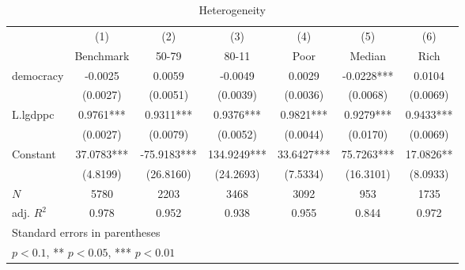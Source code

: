 \begin{table}[htbp]\centering
\def\sym#1{\ifmmode^{#1}\else\(^{#1}\)\fi}
\caption{Heterogeneity \label{tab:Heterogeneity}}
\begin{tabular}{l*{6}{c}}
\hline\hline
            &\multicolumn{1}{c}{(1)}&\multicolumn{1}{c}{(2)}&\multicolumn{1}{c}{(3)}&\multicolumn{1}{c}{(4)}&\multicolumn{1}{c}{(5)}&\multicolumn{1}{c}{(6)}\\
            &\multicolumn{1}{c}{Benchmark}&\multicolumn{1}{c}{50-79}&\multicolumn{1}{c}{80-11}&\multicolumn{1}{c}{Poor}&\multicolumn{1}{c}{Median}&\multicolumn{1}{c}{Rich}\\
\hline
democracy   &     -0.0025   &      0.0059   &     -0.0049   &      0.0029   &     -0.0228***&      0.0104   \\
            &    (0.0027)   &    (0.0051)   &    (0.0039)   &    (0.0036)   &    (0.0068)   &    (0.0069)   \\
[1em]
L.lgdppc    &      0.9761***&      0.9311***&      0.9376***&      0.9821***&      0.9279***&      0.9433***\\
            &    (0.0027)   &    (0.0079)   &    (0.0052)   &    (0.0044)   &    (0.0170)   &    (0.0069)   \\
[1em]
Constant    &     37.0783***&    -75.9183***&    134.9249***&     33.6427***&     75.7263***&     17.0826** \\
            &    (4.8199)   &   (26.8160)   &   (24.2693)   &    (7.5334)   &   (16.3101)   &    (8.0933)   \\
\hline
\(N\)       &        5780   &        2203   &        3468   &        3092   &         953   &        1735   \\
adj. \(R^{2}\)&       0.978   &       0.952   &       0.938   &       0.955   &       0.844   &       0.972   \\
\hline\hline
\multicolumn{7}{l}{\footnotesize Standard errors in parentheses}\\
\multicolumn{7}{l}{\footnotesize * \(p<0.1\), ** \(p<0.05\), *** \(p<0.01\)}\\
\end{tabular}
\end{table}
